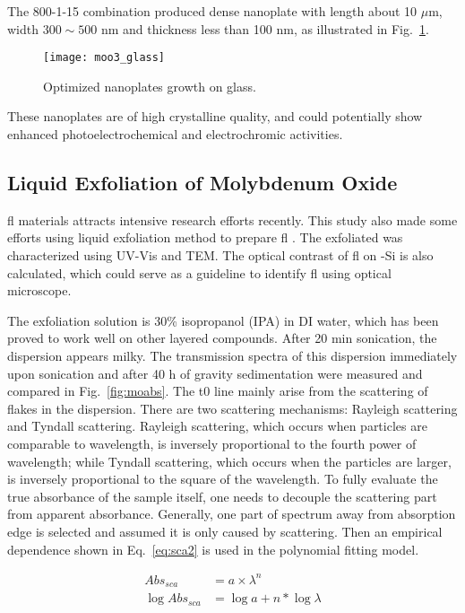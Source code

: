 The 800-1-15 combination produced dense  nanoplate with length about 10 $\mu$m, width $300\sim500$ nm and thickness less than 100 nm, as illustrated in Fig.~\ref{fig:ch4glass}. 
%
\begin{figure}[htb]
\centering
\texttt{[image: moo3\_glass]}
\caption[ nanoplates on glass]{Optimized  nanoplates growth on glass.}
\label{fig:ch4glass}
\end{figure}
These  nanoplates are of high crystalline quality, and could potentially show enhanced photoelectrochemical and electrochromic activities. 

\subsection{Liquid Exfoliation of Molybdenum Oxide}

\gls{fl} materials attracts intensive research efforts recently. This study also made some efforts using liquid exfoliation method to prepare \gls{fl} . The exfoliated  was characterized using UV-Vis and TEM. The optical contrast of \gls{fl}  on -Si is also calculated, which could serve as a guideline to identify \gls{fl}  using optical microscope.

The exfoliation solution is 30\% isopropanol (IPA) in DI water, which has been proved to work well on other layered compounds.\cite{Halim2013} After 20 min sonication, the dispersion appears milky. The transmission spectra of this dispersion immediately upon sonication and after 40 h of gravity sedimentation were measured and compared in Fig.~\ref{fig:moabs}. The t0 line mainly arise from the scattering of flakes in the dispersion. There are two scattering mechanisms: Rayleigh scattering and Tyndall scattering. Rayleigh scattering, which occurs when particles are comparable to wavelength, is inversely proportional to the fourth power of wavelength; while Tyndall scattering, which occurs when the particles are larger, is inversely proportional to the square of the wavelength. To fully evaluate the true absorbance of the sample itself, one needs to decouple the scattering part from apparent absorbance. Generally, one part of spectrum away from absorption edge is selected and assumed it is only caused by scattering. Then an empirical dependence shown in Eq.~\ref{eq:sca2} is used in the polynomial fitting model.

\begin{align}
Abs_{sca}  & = a\times \lambda^{n}  \label{eq:sca1}\\
\log{Abs_{sca}} & = \log{a} + n*\log{\lambda} \label{eq:sca2}
\end{align}

